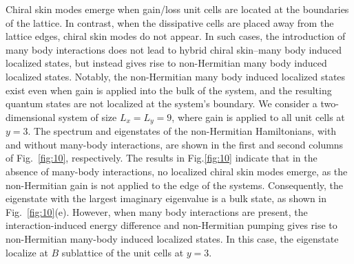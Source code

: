 \documentclass[longbibliography, aps, prx, amsmath, amssymb, amsfonts, twocolumn,superscriptaddress, footinbib]{revtex4-1}
\begin{document}
	Chiral skin modes emerge when gain/loss unit cells are located at the boundaries of the lattice. 
	In contrast, when the dissipative cells are placed away from the lattice edges, chiral skin modes do not appear. In such cases, the introduction of many body interactions does not lead to hybrid chiral skin–many body induced localized states, but instead gives rise to non-Hermitian many body induced localized states. 
	Notably, the non-Hermitian many body induced localized states exist even when gain is applied into the bulk of the system, and the resulting quantum states are not localized at the system's boundary.
	We consider a two-dimensional system of size $L_x = L_y = 9$, where gain is applied to all unit cells at $y = 3$. 
	The spectrum and eigenstates of the non-Hermitian Hamiltonians, with and without many-body interactions, are shown in the first and second columns of Fig.~\ref{fig:10}, respectively. The results in Fig.\ref{fig:10} indicate that in the absence of many-body interactions, no localized chiral skin modes emerge, as the non-Hermitian gain is not applied to the edge of the systems. 
	Consequently, the eigenstate with the largest imaginary eigenvalue is a bulk state, as shown in Fig.~\ref{fig:10}(e). However, when many body interactions are present, the interaction-induced energy difference and non-Hermitian pumping gives rise to non-Hermitian many-body induced localized states. In this case, the eigenstate localize at $B$ sublattice of the unit cells at $y = 3$.
\end{document}
